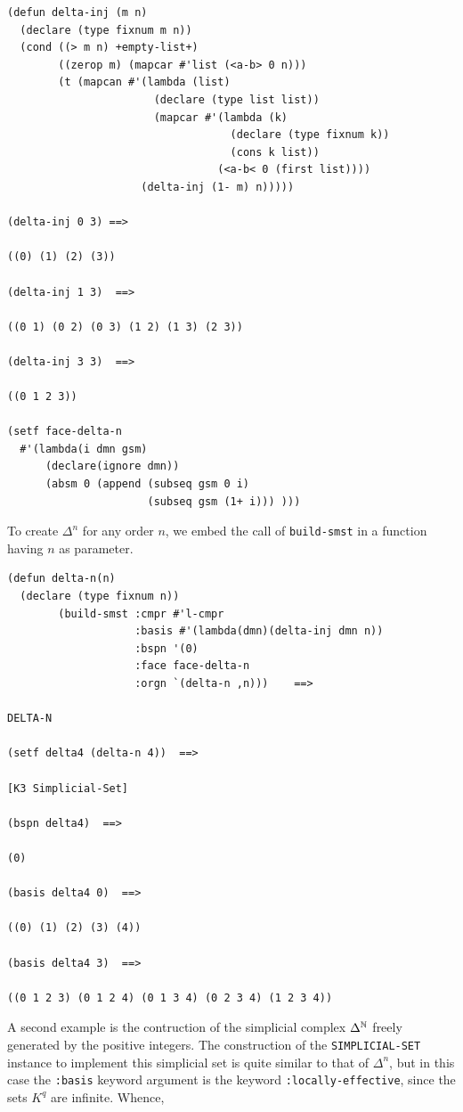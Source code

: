 {\footnotesize \begin{verbatim}
(defun delta-inj (m n)
  (declare (type fixnum m n))
  (cond ((> m n) +empty-list+)
        ((zerop m) (mapcar #'list (<a-b> 0 n)))
        (t (mapcan #'(lambda (list)
                       (declare (type list list))
                       (mapcar #'(lambda (k)
                                   (declare (type fixnum k))
                                   (cons k list))
                                 (<a-b< 0 (first list))))
                     (delta-inj (1- m) n)))))

(delta-inj 0 3) ==>

((0) (1) (2) (3))

(delta-inj 1 3)  ==>

((0 1) (0 2) (0 3) (1 2) (1 3) (2 3))

(delta-inj 3 3)  ==>

((0 1 2 3))

(setf face-delta-n
  #'(lambda(i dmn gsm)
      (declare(ignore dmn))
      (absm 0 (append (subseq gsm 0 i)
                      (subseq gsm (1+ i))) )))
\end{verbatim}}
To create $\Delta^n$ for any order $n$, we embed the call of {\tt build-smst} in a function having
$n$ as parameter. 
{\footnotesize \begin{verbatim}
(defun delta-n(n)
  (declare (type fixnum n))
        (build-smst :cmpr #'l-cmpr
                    :basis #'(lambda(dmn)(delta-inj dmn n))
                    :bspn '(0)
                    :face face-delta-n
                    :orgn `(delta-n ,n)))    ==>

DELTA-N

(setf delta4 (delta-n 4))  ==>

[K3 Simplicial-Set]

(bspn delta4)  ==>

(0)

(basis delta4 0)  ==>

((0) (1) (2) (3) (4))

(basis delta4 3)  ==>

((0 1 2 3) (0 1 2 4) (0 1 3 4) (0 2 3 4) (1 2 3 4))
\end{verbatim}}
\vskip 0.40cm
A second example is the contruction of the simplicial complex  $\Delta^{{\Bbb N}}$ freely generated 
by the positive integers. The construction of the {\tt SIMPLICIAL-SET} instance to implement this
simplicial set is quite similar to that of $\Delta^n$, but in this case the {\tt :basis} keyword
argument is  the keyword {\tt :locally-effective}, since the sets $K^q$ are infinite. Whence,
